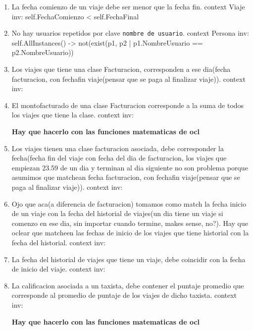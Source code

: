 \begin{enumerate}
	\item \begin{ocl}{La fecha comienzo de un viaje debe ser menor que la fecha fin.}
		  context Viaje
		  inv: self.FechaComienzo < self.FechaFinal
		\end{ocl}

	\item \begin{ocl}{No hay usuarios repetidos por clave \texttt{nombre de usuario}.}
		  context Persona
		  inv: self.AllInstances() -> not(exist(p1, p2 | p1.NombreUsuario == p2.NombreUsuario))
		\end{ocl}	

	\item \begin{ocl}{Los viajes que tiene una clase Facturacion, corresponden a ese dia(fecha facturacion, con fechafin viaje(pensar que se paga al finalizar viaje)).}
		  context 
		  inv: 
		\end{ocl}

	\item \begin{ocl}{El montofacturado de una clase Facturacion corresponde a la suma de todos los viajes que tiene la clase.}
		  context 
		  inv: 
		\end{ocl}
		\textbf{Hay que hacerlo con las funciones matematicas de ocl}

	\item \begin{ocl}{Los viajes tienen una clase facturacion asociada, debe corresponder la fecha(fecha fin del viaje con fecha del dia de facturacion, los viajes que empiezan 23.59 de un dia y terminan al dia siguiente no son problema porque asumimos que matchean fecha facturacion, con fechafin viaje(pensar que se paga al finalizar viaje)).}
		  context 
		  inv: 
		\end{ocl}

	\item \begin{ocl}{Ojo que aca(a diferencia de facturacion) tomamos como match la fecha inicio de un viaje con la fecha del historial de viajes(un dia tiene un viaje si comenzo en ese dia, sin importar cuando termine, makes sense, no?). Hay que oclear que matcheen las fechas de inicio de los viajes que tiene historial con la fecha del historial.}
		  context 
		  inv: 
		\end{ocl}

	\item \begin{ocl}{La fecha del historial de viajes que tiene un viaje, debe coincidir con la fecha de inicio del viaje.}
		  context 
		  inv: 
		\end{ocl}

	\item \begin{ocl}{La calificacion asociada a un taxista, debe contener el puntaje promedio que corresponde al promedio de puntaje de los viajes de dicho taxista.}
		  context 
		  inv: 
		\end{ocl}
		\textbf{Hay que hacerlo con las funciones matematicas de ocl}

\end{enumerate}
